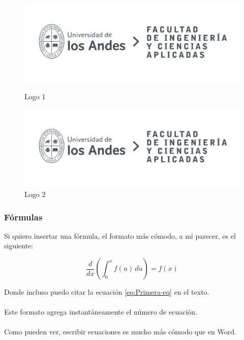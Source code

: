 \documentclass{article} %
\begin{document}
\begin{figure}[H] %
    \centering
    \begin{minipage}[b]{0.45\linewidth}
        \includegraphics[width=\linewidth]{LOGO_UNIVERSIDAD.jpg}
        \caption{Logo 1}
        \label{fig:logo1}
    \end{minipage}
    \hfill
    \begin{minipage}[b]{0.45\linewidth}
        \includegraphics[width=\linewidth]{LOGO_UNIVERSIDAD.jpg}
        \caption{Logo 2}
        \label{fig:logo2}
    \end{minipage}
\end{figure}

\subsubsection{Fórmulas}

Si quiero insertar una fórmula, el formato más cómodo, a mi parecer, es el siguiente:

\begin{equation}
    \label{eq:Primera-eq}
    \frac{d}{dx} \left( \int_{0}^{x} f(u) \, du \right) = f(x)
\end{equation}

Donde incluso puedo citar la ecuación \ref{eq:Primera-eq} en el texto.
\\ \\
Este formato agrega instantáneamente el número de ecuación.
\\ \\
Como pueden ver, escribir ecuaciones es mucho más cómodo que en Word.
\end{document}
